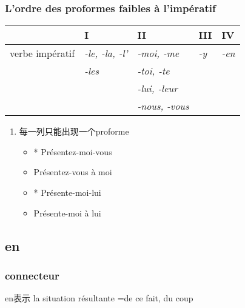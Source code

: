 \documentclass[UTF8]{report}
\begin{document}
\subsubsection{L’ordre des proformes faibles à l’impératif}
\begin{table}[H]
\centering
\begin{tabular}{|l|l|l|l|l|}
\hline
\textbf{} & \textbf{I} & \textbf{II} & \textbf{III} & \textbf{IV} \\
\hline
verbe impératif & \textit{-le, -la, -l'} & \textit{-moi, -me} & \textit{-y} & \textit{-en} \\
& \textit{-les} & \textit{-toi, -te} & & \\
& & \textit{-lui, -leur} & & \\
& & \textit{-nous, -vous} & & \\
\hline
\end{tabular}
\end{table}

\begin{enumerate}
    \item 每一列只能出现一个proforme
    \begin{itemize}
        \item * Présentez-moi-vous
        \item Présentez-vous à moi
        \item * Présente-moi-lui 
        \item Présente-moi à lui
    \end{itemize}
\end{enumerate}

\subsection{en}
\subsubsection{connecteur}
en表示 la situation résultante =de ce fait, du coup
\end{document}

